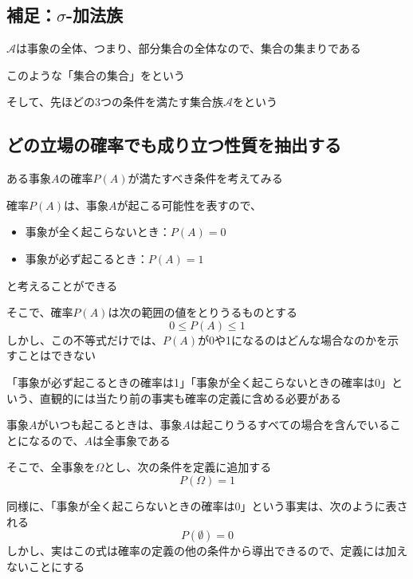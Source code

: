 \documentclass[../../../topic_probability-statistics]{subfiles}
\begin{document}
\subsection{補足：$\sigma$-加法族}

$\mathscr{A}$は事象の全体、つまり、部分集合の全体なので、集合の集まりである

このような「集合の集合」をという

\br

そして、先ほどの3つの条件を満たす集合族$\mathscr{A}$をという

\subsection{どの立場の確率でも成り立つ性質を抽出する}

ある事象$A$の確率$P(A)$が満たすべき条件を考えてみる

\br

確率$P(A)$は、事象$A$が起こる可能性を表すので、
\begin{itemize}
  \item 事象が全く起こらないとき：$P(A) =0$
  \item 事象が必ず起こるとき：$P(A) = 1$
\end{itemize}
と考えることができる

\br

そこで、確率$P(A)$は次の範囲の値をとりうるものとする
\begin{equation*}
  0 \leq P(A) \leq 1
\end{equation*}
しかし、この不等式だけでは、$P(A)$が0や1になるのはどんな場合なのかを示すことはできない

\br

「事象が必ず起こるときの確率は1」「事象が全く起こらないときの確率は0」という、直観的には当たり前の事実も確率の定義に含める必要がある

\br

事象$A$がいつも起こるときは、事象$A$は起こりうるすべての場合を含んでいることになるので、$A$は全事象である

そこで、全事象を$\Omega$とし、次の条件を定義に追加する
\begin{equation*}
  P(\Omega) = 1
\end{equation*}

\br

同様に、「事象が全く起こらないときの確率は0」という事実は、次のように表される
\begin{equation*}
  P(\emptyset) = 0
\end{equation*}
しかし、実はこの式は確率の定義の他の条件から導出できるので、定義には加えないことにする
\end{document}
